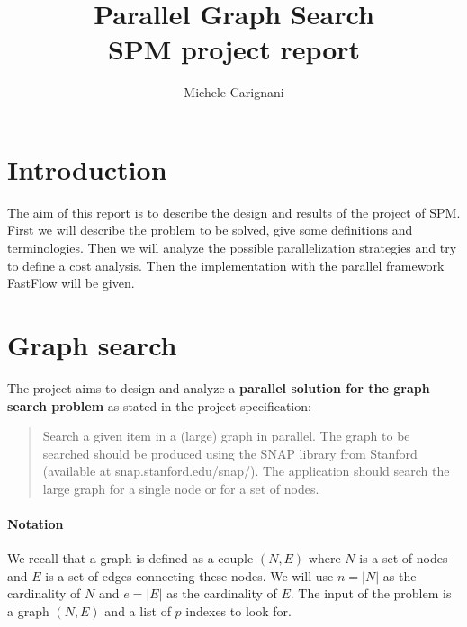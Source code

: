 \documentclass[11pt]{article}
\title{\textbf{Parallel Graph Search} \\ SPM project report}
\author{Michele Carignani}
\begin{document}
\maketitle
\section{Introduction}

The aim of this report is to describe the design and results of the project of SPM. First we will describe the problem to be solved, give some definitions and terminologies. Then we will analyze the possible parallelization strategies and try to define a cost analysis. Then the implementation with the parallel framework FastFlow will be given.


\section{Graph search}


The project aims to design and analyze a \textbf{parallel solution for the graph search problem} as stated in the project specification:

\begin{quote}
Search a given item in a (large) graph in parallel. The graph to be searched should be produced using the SNAP library from Stanford (available at snap.stanford.edu/snap/). The application should search the large graph for a single node or for a set of nodes.
\end{quote}

\paragraph{Notation} We recall that a graph is defined as a couple $(N, E)$ where $N$ is a set of nodes and $E$ is a set of edges connecting these nodes. We will use $n = \vert{N}\vert$ as the cardinality of $N$ and $e = \vert E \vert$ as the cardinality of $E$. The input of the problem is a graph $(N,E)$ and a list of $p$ indexes to look for.
\end{document}
